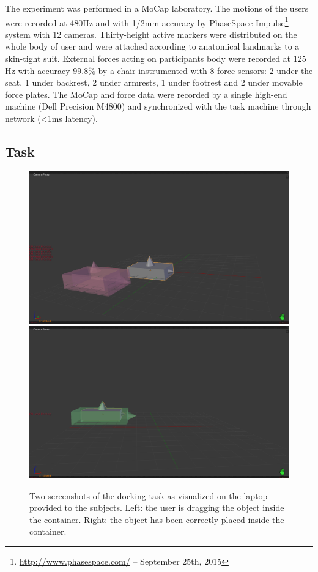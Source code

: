 The experiment was performed in a MoCap laboratory. The motions of the users were recorded at 480Hz and with 1/2mm accuracy by PhaseSpace Impulse\footnote{\url{http://www.phasespace.com/} -- September 25th, 2015} system with 12 cameras. Thirty-height active markers were distributed on the whole body of user and were attached according to anatomical landmarks to a skin-tight suit. 
External forces acting on participants body were recorded at 125 Hz with accuracy 99.8\% by a chair instrumented with 8 force sensors: 2 under the seat, 1 under backrest, 2 under armrests, 1 under footrest and 2 under movable force plates. 
The MoCap and force data were recorded by a single high-end machine (Dell Precision M4800) and synchronized with the task machine through network (\textless 1ms latency).


\subsection{Task}

\begin{figure}%
\centering%
\includegraphics[width=\columnwidth]{img/task-performing-crop}
\includegraphics[width=\columnwidth]{img/task-accomplished-crop}
\caption{Two screenshots of the docking task as visualized on the laptop provided to the subjects. Left: the user is dragging the object inside the container. Right: the object has been correctly placed inside the container.}%
\label{fig:task-screenshots}
\end{figure}

